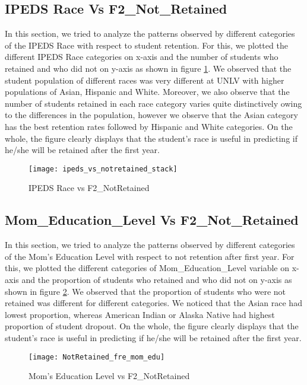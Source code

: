 \documentclass[11pt,openright]{report}
\begin{document}
\subsection {IPEDS Race Vs F2\_Not\_Retained}
In this section, we tried to analyze the patterns observed by different categories of the IPEDS Race with respect to student retention. For this, we plotted the different IPEDS Race categories on x-axis and the number of students who retained and who did not on y-axis as shown in figure \ref{fig:ipeds_F2NotRetained_plot}. We observed that the student population of different races was very different at UNLV with higher populations of Asian, Hispanic and White. Moreover, we also observe that the number of students retained in each race category varies quite distinctively owing to the differences in the population, however we observe that the Asian category has the best retention rates followed by Hispanic and White categories. On the whole, the figure clearly displays that the student's race is useful in predicting if he/she will be retained after the first year.

\begin{figure}[!ht]
	\centering
	\texttt{[image: ipeds\_vs\_notretained\_stack]}
	\caption{IPEDS Race vs F2\_NotRetained}
	\label{fig:ipeds_F2NotRetained_plot}
\end{figure}

\subsection {Mom\_Education\_Level Vs F2\_Not\_Retained}
In this section, we tried to analyze the patterns observed by different categories of the Mom's Education Level with respect to not retention after first year. For this, we plotted the different categories of Mom\_Education\_Level variable on x-axis and the proportion of students who retained and who did not on y-axis as shown in figure \ref{fig:mom_edu_F2NotRetained_plot}. We observed that the proportion of students who were not retained was different for different categories. We noticed that the Asian race had lowest proportion, whereas American Indian or Alaska Native had highest proportion of student dropout. On the whole, the figure clearly displays that the student's race is useful in predicting if he/she will be retained after the first year.

\begin{figure}[!ht]
	\centering
	\texttt{[image: NotRetained\_fre\_mom\_edu]}
	\caption{Mom's Education Level vs F2\_NotRetained}
	\label{fig:mom_edu_F2NotRetained_plot}
\end{figure}
\end{document}
